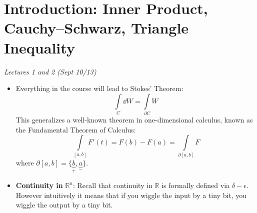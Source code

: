 \section{Introduction: Inner Product, Cauchy–Schwarz, Triangle Inequality}
\textit{Lectures 1 and 2 (Sept 10/13)}
\begin{itemize}
    \item Everything in the course will lead to Stokes' Theorem:
          \begin{equation}
              \int\limits_C \dd{W} = \int\limits_{\partial C}W
          \end{equation}
          This generalizes a well-known theorem in one-dimensional calculus, known as the Fundamental Theorem of Calculus:
          \begin{equation}
              \int\limits_{[a,b]} F'(t) = F(b) - F(a) = \int\limits_{\partial[a,b]}F
          \end{equation}
          where $\partial[a,b] = \{\underbrace{b}_{+},\underbrace{a}_{-}\}$.
    \item \textbf{Continuity in} $\mathbb{R}^n$: Recall that continuity in $\mathbb{R}$ is formally defined via $\delta-\epsilon.$ However intuitively it means that if you wiggle the input by a tiny bit, you wiggle the output by a tiny bit.


\end{itemize}
